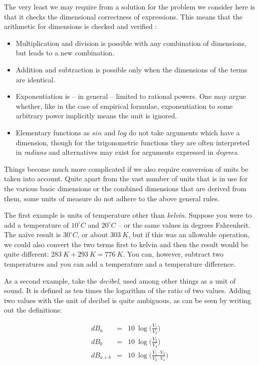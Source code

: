 \documentclass{article}
\begin{document}
The very least we may require from a solution for the problem we consider here is that it checks the dimensional correctness
of expressions. This means that the arithmetic for dimensions is checked and verified \cite{DimensionalAnalysis}:
\begin{itemize}
\item
Multiplication and division is possible with any combination of dimensions, but leads to a new combination.
\item
Addition and subtraction is possible only when the dimensions of the terms are identical.
\item
Exponentiation is -- in general -- limited to rational powers. One may argue whether, like in the case of empirical
formulae, exponentiation to some arbitrary power implicitly means the unit is ignored.
\item
Elementary functions as $sin$ and $log$ do not take arguments which have a dimension, though for the trigonometric functions
they are often interpreted in \emph{radians} and alternatives may exist for arguments expressed in \emph{degrees}.
\end{itemize}

Things become much more complicated if we also require conversion of units be taken into account. Quite apart from
the vast number of units that is in use for the various basic dimensions or the combined dimensions that are derived
from them, some units of measure do not adhere to the above general rules.

The first example is units of temperature other than \emph{kelvin}. Suppose you were to add a temperature of $10 ^\circ C$
and $20 ^\circ C$ -- or the same values in degrees Fahrenheit. The na\"ive result is $30 ^\circ C$, or about $303~K$, but if this was an
allowable operation, we could also convert the two terms first to kelvin and then the result would be quite different:
$ 283~K + 293~K = 776~K$. You can, however, subtract two temperatures and you can add a temperature and a temperature difference.

As a second example, take the \emph{decibel}, used among other things as a unit of sound. It is defined as ten times the
logarithm of the ratio of two values. Adding two values with the unit of decibel is quite ambiguous, as can be seen
by writing out the definitions:

\begin{eqnarray}
   dB_{a}   &=& 10 ~ \log \bigl ( \frac{V_1}{V_2} \bigr ) \\
   dB_{b}   &=& 10 ~ \log \bigl ( \frac{V_3}{V_4} \bigr ) \\
   dB_{a+b} &=& 10 ~ \log \bigl ( \frac{V_1 \cdot V_3}{V_2 \cdot V_4} \bigr )
\end{eqnarray}
\end{document}
